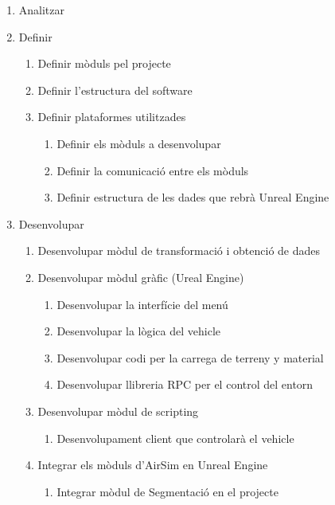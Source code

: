 \documentclass[10pt,a4paper,twocolumn,twoside]{article}
\begin{document}
\begin{enumerate}
  \item Analitzar
  
  \item Definir
  \begin{enumerate}
    \item Definir mòduls pel projecte
    \item Definir l'estructura del software
    
    \item Definir plataformes utilitzades
    \begin{enumerate}
    	\item Definir els mòduls a desenvolupar
	    \item Definir la comunicació entre els mòduls
    	\item Definir estructura de les dades que rebrà Unreal Engine
  	\end{enumerate}
  \end{enumerate}
  
  \item Desenvolupar
  \begin{enumerate}
    \item Desenvolupar mòdul de transformació i obtenció de dades
    \item Desenvolupar mòdul gràfic (Ureal Engine)
    \begin{enumerate}
    	\item Desenvolupar la interfície del menú
	    \item Desenvolupar la lògica del vehicle
    	\item Desenvolupar codi per la carrega de terreny y material
    	\item Desenvolupar llibreria RPC per el control del entorn
  	\end{enumerate}
  	
  	\item Desenvolupar mòdul de scripting
  	\begin{enumerate}
    	\item Desenvolupament client que controlarà el vehicle
  	\end{enumerate}
  	
  	\item Integrar els mòduls d'AirSim en Unreal Engine
  	\begin{enumerate}
    	\item Integrar mòdul de Segmentació en el projecte
  	\end{enumerate}
  	

\end{enumerate}
\end{enumerate}
\end{document}
